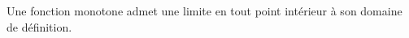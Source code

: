 Une fonction monotone admet une limite en tout point intérieur à son domaine de définition.

\begin{reponses}
\end{reponses}

